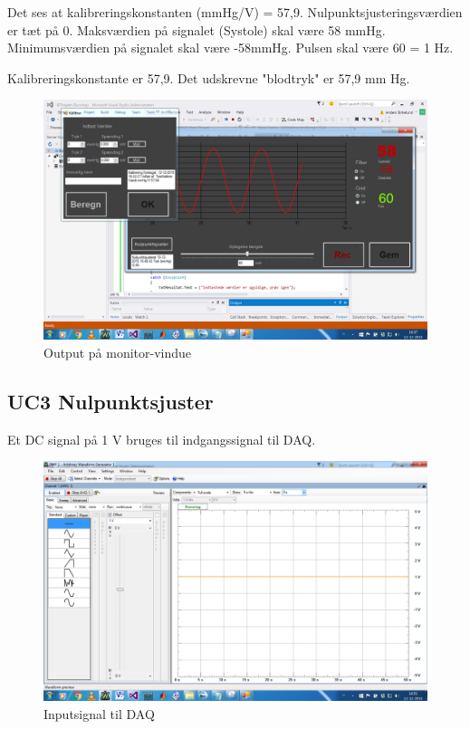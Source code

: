 Det ses at kalibreringskonstanten (mmHg/V) = 57,9.
Nulpunktsjusteringsværdien er tæt på 0.
Maksværdien på signalet (Systole) skal være 58 mmHg.
Minimumsværdien på signalet skal være -58mmHg. 
Pulsen skal være 60 = 1 Hz.

Kalibreringskonstante er 57,9. Det udskrevne "blodtryk" er 57,9 mm Hg.
\begin{figure}[H]
	\centering
	\includegraphics[width=1\textwidth]{Figurer/Test_Vis_2}
	\caption{Output på monitor-vindue}
\end{figure}




\subsection{UC3 Nulpunktsjuster}

Et DC signal på 1 V bruges til indgangssignal til DAQ.
\begin{figure}[H]
	\centering
	\includegraphics[width=1\textwidth]{Figurer/Test_Nul_1}
	\caption{Inputsignal til DAQ}
\end{figure}


